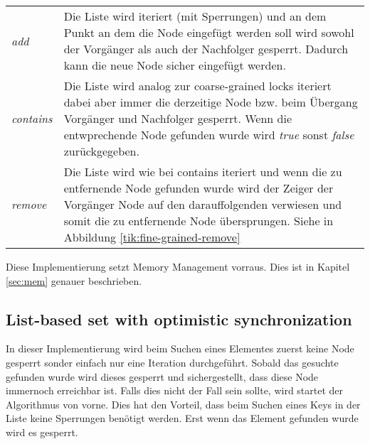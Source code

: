 \begin{table}[H]
    \begin{tabularx}{\textwidth}{lX}
        \textit{add} & Die Liste wird iteriert (mit Sperrungen) und an dem Punkt an dem die Node eingefügt werden soll wird sowohl der Vorgänger als auch der Nachfolger gesperrt. Dadurch kann die neue Node sicher eingefügt werden.\\
        \textit{contains} & Die Liste wird analog zur coarse-grained locks iteriert dabei aber immer die derzeitige Node bzw. beim Übergang Vorgänger und Nachfolger gesperrt. Wenn die entwprechende Node gefunden wurde wird \textit{true} sonst \textit{false} zurückgegeben. \\
        \textit{remove} & Die Liste wird wie bei contains iteriert und wenn die zu entfernende Node gefunden wurde wird der Zeiger der Vorgänger Node auf den darauffolgenden verwiesen und somit die zu entfernende Node übersprungen. Siehe in Abbildung \ref{tik:fine-grained-remove}\\
    \end{tabularx}
\end{table}

Diese Implementierung setzt Memory Management vorraus. Dies ist in Kapitel \ref{sec:mem} genauer beschrieben.

\subsection{List-based set with optimistic synchronization}

In dieser Implementierung wird beim Suchen eines Elementes zuerst keine Node gesperrt sonder einfach nur eine Iteration durchgeführt. Sobald das gesuchte gefunden wurde wird dieses gesperrt und sichergestellt, dass diese Node immernoch erreichbar ist. Falls dies nicht der Fall sein sollte, wird startet der Algorithmus von vorne. Dies hat den Vorteil, dass beim Suchen eines Keys in der Liste keine Sperrungen benötigt werden. Erst wenn das Element gefunden wurde wird es gesperrt.

